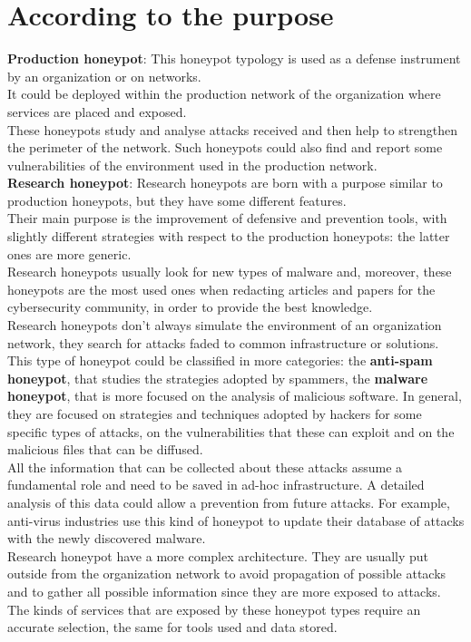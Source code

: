 \section{According to the purpose}
\textbf{Production honeypot}:
This honeypot typology is used as a defense instrument by an organization or on networks.\\ 
It could be deployed within the production network of the organization where services are placed and exposed.\\
These honeypots study and analyse attacks received and then help to strengthen the perimeter of the network. Such honeypots could also find and report some vulnerabilities of the environment used in the production network.  \\
\textbf{Research honeypot}:
Research honeypots are born with a purpose similar to production honeypots, but they have some different features.\\
Their main purpose is the improvement of defensive and prevention tools, with slightly different strategies with respect to the production honeypots: the latter ones are more generic.\\
Research honeypots usually look for new types of malware and, moreover, these honeypots are the most used ones when redacting articles and papers for the cybersecurity community, in order to provide the best knowledge.\\
Research honeypots don't always simulate the environment of an organization network, they search for attacks faded to common infrastructure or solutions.\\
This type of honeypot could be classified in more categories: the \textbf{anti-spam honeypot}, that studies the strategies adopted by spammers, the \textbf{malware honeypot}, that is more focused on the analysis of malicious software. In general, they are focused  on strategies and techniques adopted by hackers for some specific types of attacks, on the vulnerabilities that these can exploit and on the malicious files that can be diffused.\\
All the information that can be collected about these attacks assume a fundamental role and need to be saved in ad-hoc infrastructure. A detailed analysis of this data could allow a prevention from future attacks. For example, anti-virus industries use this kind of honeypot to update their database of attacks with the newly discovered malware.\\
Research honeypot have a more complex architecture. They are usually put outside from the organization network to avoid propagation of possible attacks and to gather all possible information since they are more exposed to attacks. The kinds of services that are exposed by these honeypot types require an accurate selection, the same for tools used and data stored.
